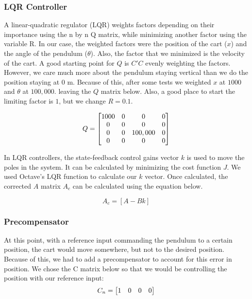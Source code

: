 \documentclass{article}
\begin{document}
\subsubsection{LQR Controller}
A linear-quadratic regulator (LQR) weights factors depending on their importance using the n by n Q matrix, while minimizing another factor using the variable R. In our case, the weighted factors were the position of the cart ($x$) and the angle of the pendulum ($\theta$). Also, the factor that we minimized is the velocity of the cart. A good starting point for $Q$ is $C'C$ evenly weighting the factors. However, we care much more about the pendulum staying vertical than we do the position staying at 0 m. Because of this, after some tests we weighted $x$ at $1000$ and $\theta$ at $100,000$. leaving the $Q$ matrix below. Also, a good place to start the limiting factor is $1$, but we change $R = 0.1$.

 \begin{equation} 
\label{q}
\centering
Q = \begin{bmatrix}
	1000&0&0&0\\
	0&0&0&0\\
	0&0&100,000&0\\
	0&0&0&0\\
	\end{bmatrix}
\end{equation}

In LQR controllers, the state-feedback control gains vector $k$ is used to move the poles in the system. It can be calculated by minimizing the cost function $J$. We used Octave's LQR function to calculate our $k$ vector. Once calculated, the corrected $A$ matrix $A_c$ can be calculated using the equation below.

\begin{equation}
\label{ac}
A_c=[A-Bk]
\end{equation}

\subsubsection{Precompensator}
At this point, with a reference input commanding the pendulum to a certain position, the cart would move somewhere, but not to the desired position. Because of this, we had to add a precompensator to account for this error in position. We chose the C matrix below so that we would be controlling the position with our reference input:
\\

\begin{equation}
\label{pcomp}
\centering
C_n = \begin{bmatrix}
1 & 0 & 0 & 0
\end{bmatrix}
\end{equation}
 
\end{document}
